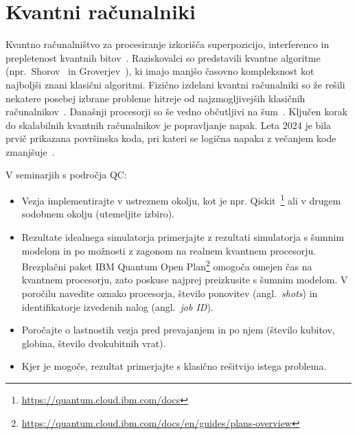 \newpage
\section*{Kvantni računalniki}
\label{g00:sec:qc}

Kvantno računalništvo za procesiranje izkorišča superpozicijo, interferenco in prepletenost kvantnih bitov~\cite{nielsen2010}. Raziskovalci so predstavili kvantne algoritme (npr.\ Shorov~\cite{shor1997} in Groverjev~\cite{grover1996}), ki imajo manjšo časovno kompleksnost kot najboljši znani klasični algoritmi. Fizično izdelani kvantni računalniki so že rešili nekatere posebej izbrane probleme hitreje od najzmogljivejših klasičnih računalnikov~\cite{arute2019quantum, wu2021strong}. Današnji procesorji so še vedno občutljivi na šum~\cite{preskill2018}. Ključen korak do skalabilnih kvantnih računalnikov je popravljanje napak. Leta 2024 je bila prvič prikazana površinska koda, pri kateri se logična napaka z večanjem kode zmanjšuje~\cite{google2025below}.

V seminarjih s področja QC:
\begin{itemize}
\item Vezja implementirajte v ustreznem okolju, kot je npr. Qiskit~\cite{qiskit2024}\footnote{\url{https://quantum.cloud.ibm.com/docs}} ali v drugem sodobnem okolju (utemeljite izbiro).
\item Rezultate idealnega simulatorja primerjajte z rezultati simulatorja s šumnim modelom in po možnosti z zagonom na realnem kvantnem procesorju. Brezplačni paket IBM Quantum Open Plan\footnote{\url{https://quantum.cloud.ibm.com/docs/en/guides/plans-overview}} omogoča omejen čas na kvantnem procesorju, zato poskuse najprej preizkusite s šumnim modelom. V poročilu navedite oznako procesorja, število ponovitev (angl.\ \emph{shots}) in identifikatorje izvedenih nalog (angl.\ \emph{job ID}).
\item Poročajte o lastnostih vezja pred prevajanjem in po njem (število kubitov, globina, število dvokubitnih vrat).
\item Kjer je mogoče, rezultat primerjajte s klasično rešitvijo istega problema.
\end{itemize}
